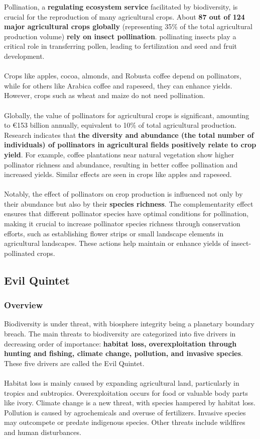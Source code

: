 \documentclass[../summary.tex]{subfiles}
\begin{document}
Pollination, a \textbf{regulating ecosystem service} facilitated by biodiversity, is crucial for the reproduction of many agricultural crops. About \textbf{87 out of 124 major agricultural crops globally} (representing 35\% of the total agricultural production volume) \textbf{rely on insect pollination}. pollinating insects play a critical role in transferring pollen, leading to fertilization and seed and fruit development.\\
\\
Crops like apples, cocoa, almonds, and Robusta coffee depend on pollinators, while for others like Arabica coffee and rapeseed, they can enhance yields. However, crops such as wheat and maize do not need pollination.\\
\\
Globally, the value of pollinators for agricultural crops is significant, amounting to €153 billion annually, equivalent to 10\% of total agricultural production. Research indicates that \textbf{the diversity and abundance (the total number of individuals) of pollinators in agricultural fields positively relate to crop yield}. For example, coffee plantations near natural vegetation show higher pollinator richness and abundance, resulting in better coffee pollination and increased yields. Similar effects are seen in crops like apples and rapeseed.\\
\\
Notably, the effect of pollinators on crop production is influenced not only by their abundance but also by their \textbf{species richness}. The complementarity effect ensures that different pollinator species have optimal conditions for pollination, making it crucial to increase pollinator species richness through conservation efforts, such as establishing flower strips or small landscape elements in agricultural landscapes. These actions help maintain or enhance yields of insect-pollinated crops.

\subsection{Evil Quintet}
\subsubsection{Overview}
Biodiversity is under threat, with biosphere integrity being a planetary boundary breach. The main threats to biodiversity are categorized into five drivers in decreasing order of importance: \textbf{habitat loss, overexploitation through hunting and fishing, climate change, pollution, and invasive species}. These five drivers are called the Evil Quintet. \\
\\
Habitat loss is mainly caused by expanding agricultural land, particularly in tropics and subtropics. Overexploitation occurs for food or valuable body parts like ivory. Climate change is a new threat, with species hampered by habitat loss. Pollution is caused by agrochemicals and overuse of fertilizers. Invasive species may outcompete or predate indigenous species. Other threats include wildfires and human disturbances.
\end{document}
